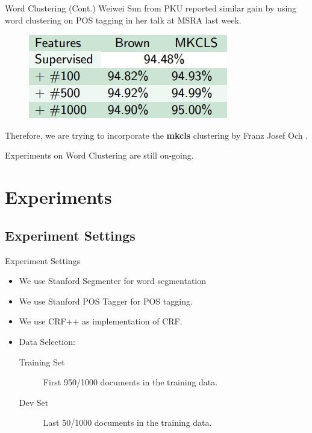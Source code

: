 \documentclass{beamer}
\begin{document}
\begin{frame}{Word Clustering (Cont.)}
	Weiwei Sun from PKU reported similar gain by using word clustering on POS tagging \citep{sun2012capturing} in her talk at MSRA last week.
	\begin{figure}[h]
		\centering
		\includegraphics[height=0.2\textheight]{./figures/sun-cluster.png}
		\label{fig:sun-cluster}
	\end{figure}
	\pause

	Therefore, we are trying to incorporate the \textbf{mkcls} clustering by Franz Josef Och \citep{och1999efficient}.
	\pause

	Experiments on Word Clustering are still on-going.
\end{frame}

\section{Experiments}
\subsection{Experiment Settings}
\frame{\sectionpage}

\begin{frame}{Experiment Settings}
	\begin{itemize}
		\item We use Stanford Segmenter\citep{tseng2005conditional} for word segmentation
			\pause
		\item We use Stanford POS Tagger\citep{toutanova2000enriching} for POS tagging.
			\pause
		\item We use CRF++ as implementation of CRF.
			\pause
		\item Data Selection:
			\begin{description}
				\item[Training Set] First 950/1000 documents in the training data.
				\item[Dev Set] Last 50/1000 documents in the training data.
			\end{description}
	\end{itemize}
\end{frame}
\end{document}
